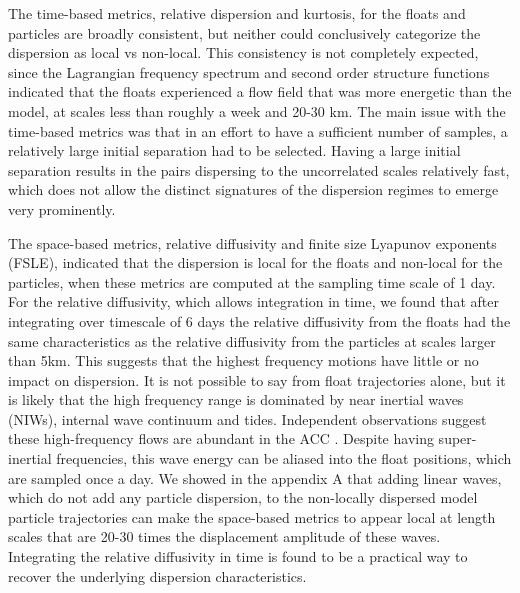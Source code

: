 \documentclass[]{ametsoc}
\begin{document}
The time-based metrics, relative dispersion and kurtosis, for the floats and particles are broadly consistent, but neither could conclusively categorize the dispersion as local vs non-local. This consistency is not completely expected, since the Lagrangian frequency spectrum and second order structure functions indicated that the floats experienced a flow field that was more energetic than the model, at scales less than roughly a week and 20-30 km. The main issue with the time-based metrics was that in an effort to have a sufficient number of samples, a relatively large initial separation had to be selected. Having a large initial separation results in the pairs dispersing to the uncorrelated scales relatively fast, which does not allow the distinct signatures of the dispersion regimes to emerge very prominently.

The space-based metrics, relative diffusivity and finite size Lyapunov exponents (FSLE), indicated that the dispersion is local for the floats and non-local for the particles, when these metrics are computed at the sampling time scale of 1 day. For the relative diffusivity, which allows integration in time, we found that after integrating over timescale of 6 days the relative diffusivity from the floats had the same characteristics as the relative diffusivity from the particles at scales larger than 5km. This suggests that the highest frequency motions have little or no impact on dispersion. It is not possible to say from float trajectories alone, but it is likely that the high frequency range is dominated by near inertial waves (NIWs), internal wave continuum and tides. Independent observations suggest these high-frequency flows are abundant in the ACC \citep[e.g][]{ledwell2011diapycnal, waterman2013internal, kilbourne2015quantifying}. 
Despite having super-inertial frequencies, this wave energy can be aliased into the float positions, which are sampled once a day.
We showed in the appendix A that adding linear waves, which do not add any particle dispersion, to the non-locally dispersed model particle trajectories can make the space-based metrics to appear local at length scales that are 20-30 times the displacement amplitude of these waves. Integrating the relative diffusivity in time is found to be a practical way to recover the underlying dispersion characteristics. 

\end{document}
